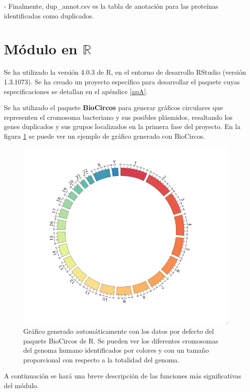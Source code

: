 - Finalmente, dup\_annot.csv es la tabla de anotación para las proteínas identificadas como duplicados.

\section{Módulo en $\mathbb{R}$}

Se ha utilizado la versión 4.0.3 de R, en el entorno de desarrollo RStudio (versión 1.3.1073). Se ha creado un proyecto específico para desarrollar el paquete cuyas especificaciones se detallan en el apéndice \ref{apA}.

Se ha utilizado el paquete \textbf{BioCircos} \cite{cui_biocircosjs_2016, vulliard_biocircos_2019} para generar gráficos circulares que representen el cromosoma bacteriano y sus posibles plásmidos, resaltando los genes duplicados y sus grupos localizados en la primera fase del proyecto. En la figura \ref{fig:ex_BioCircos} se puede ver un ejemplo de gráfico generado con BioCircos.

\begin{figure}[h]
	\centering
	\captionsetup{width=0.5\linewidth} 
	\includegraphics[width=0.5\linewidth]{figs/ex_biocircos.png}
	\caption[Ejemplo de gráfico BioCircos]{Gráfico generado automáticamente con los datos por defecto del paquete BioCircos de R. Se pueden ver los diferentes cromosomas del genoma humano identificados por colores y con un tamaño proporcional con respecto a la totalidad del genoma.}
	\label{fig:ex_BioCircos}
\end{figure}

A continuación se hará una breve descripción de las funciones más significativas del módulo. 

